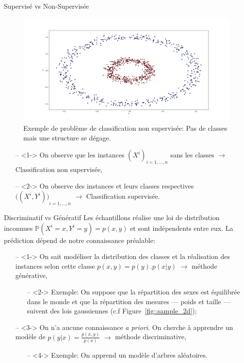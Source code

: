 \documentclass[9pt]{beamer}
\begin{document}
	\begin{frame}{Supervisé vs Non-Supervisée}
		\begin{figure}[H]
			\begin{center}
				\includegraphics[width=.7\textwidth]{circles}
				\caption{\label{fig::circles} Exemple de problème de classification non supervisée: Pas de classes mais une structure se dégage.}
			\end{center}
		\end{figure}
		\begin{itemize}
			\item[--]<1-> On observe que les instances ${(X^i)}_{i=1,\dots,n}$ sans les classes $\longrightarrow$ Classification non supervisée,
			\item[--]<2-> On observe des instances et leurs classes respectives ${\Big((X^i, Y^i)\Big)}_{i=1,\dots,n}$ $\longrightarrow$ Classification supervisée.
		\end{itemize}
	\end{frame}

	\begin{frame}{Discriminatif vs Génératif}
		Les échantillons réalise une loi de distribution inconnues $\mathbb{P}(X^i=x,Y^i=y)=p(x,y)$ et sont indépendents entre eux. La prédiction dépend de notre connaissance préalable:
		\begin{itemize}
			\item[--]<1-> On sait modéliser la distribution des classes et la réalisation des instances selon cette classe $p(x,y) = p(y).p(x\vert y)$ $\longrightarrow$ méthode générative,
			\begin{itemize}
				\item[--]<2-> Exemple: On suppose que la répartition des sexes est équilibrée dans le monde et que la répartition des mesures --- poids et taille --- suivent des lois gaussiennes (c.f Figure~\ref{fig::sample_2d});
			\end{itemize}
			\item[--]<3-> On n'a aucune connaissance \textit{a priori}. On cherche à apprendre un modèle de $ p(y \vert x) = \frac{p(x,y)}{p(x)}$ $\longrightarrow$ méthode discriminative,
			\begin{itemize}
				\item[--]<4-> Exemple: On apprend un modèle d'arbres aléatoires.
			\end{itemize}
		\end{itemize}
	\end{frame}
\end{document}
